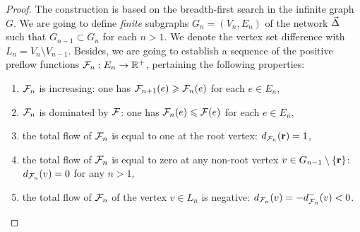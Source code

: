 \documentclass[12pt]{amsart}
\begin{document}
\begin{proof}
      The construction is based on the breadth-first search in the infinite graph $G$.
      We are going to define \emph{finite} subgraphs $G_n = (V_n, E_n)$ of the network $\vec{\Delta}$ such that $G_{n-1} \subset G_{n}$ for each $n > 1$.
      We denote the vertex set difference with $L_n = V_n \setminus V_{n-1}$.
      Besides, we are going to establish a sequence of the positive preflow functions $\mathcal{F}_{n}: E_n \to \mathbb{R}^{+}$,
        pertaining the following properties:
        \begin{enumerate}[label=\textbf{P\arabic*}]
          \item \label{p1} $\mathcal{F}_{n}$ is increasing:
            one has $\mathcal{F}_{n+1}(e) \geqslant \mathcal{F}_{n}(e)$ for each $e \in E_n$,
          \item \label{p2} $\mathcal{F}_{n}$ is dominated by $\mathcal{F}$:
            one has $\mathcal{F}_{n}(e) \leqslant \mathcal{F}(e)$ for each $e \in E_n$,
          \item \label{p3} the total flow of $\mathcal{F}_{n}$ is equal to one at the root vertex: $d_{\mathcal{F}_{n}}(\mathbf{r}) = 1$,
          \item \label{p4} the total flow of $\mathcal{F}_{n}$ is equal to zero at any non-root vertex
            $v \in G_{n-1}\setminus \left\{\mathbf{r}\right\}$: $d_{\mathcal{F}_{n}}(v) = 0$ for any $n > 1$,
          \item \label{p5} the total flow of $\mathcal{F}_{n}$
            of the vertex $v \in L_n$ is negative: $d_{\mathcal{F}_{n}}(v) = -d^{-}_{\mathcal{F}_{n}}(v) < 0$.
        \end{enumerate}

\end{proof}
\end{document}
